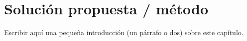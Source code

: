 \chapter{Solución propuesta / método}
\label{chap:03sol-met}

Escribir aquí una pequeña introducción (un párrafo o dos) sobre este capítulo.
